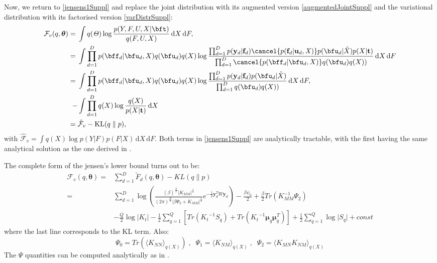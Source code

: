 %
Now, we return to \ref{jensens1Suppl} and replace the joint distribution with its augmented version \eqref{augmentedJointSuppl} and the variational distribution with its factorised version \eqref{varDistrSuppl}:
\begin{align}
\mathcal{F}_v(q, \boldsymbol \theta) = {}& \int q(\mathit{\Theta}) \log 
		\frac{ p(Y,F, U,X | \bft)}
			 {q(F, U,X)}  \, \mathrm{d} X \,\mathrm{d}F,
 	    \nonumber \\
= {}& \int \prod_{d=1}^D p(\bff_d | \bfu_d, X )q(\bfu_d) q(X) 
	    \log  \frac{\prod_{d=1}^D p(\mathbf{y}_d | \mathbf{f}_d) \cancel{p(\mathbf{f}_d | \mathbf{u}_d, \mathit{X})}
						p(\bfu_d | \tilde{X})  p(X | \mathbf{t})}
 	      		   {\prod_{d=1}^D \cancel{p(\bff_d | \bfu_d, X )}q(\bfu_d) q(X))}   \, \mathrm{d} X \,\mathrm{d}F \nonumber \\
= {}& \int \prod_{d=1}^D p(\bff_d | \bfu_d, X )q(\bfu_d) q(X) 
		\log  \frac{\prod_{d=1}^D p(\mathbf{y}_d | \mathbf{f}_d) p(\bfu_d | \tilde{X})}
				   {\prod_{d=1}^D q(\bfu_d) q(X))}   \, \mathrm{d} X \,\mathrm{d}F, \nonumber \\
- {}& \int \prod_{d=1}^D  q(X)   \log \frac{q(X)}{p(X | \mathbf{t})}   \, \mathrm{d} X \nonumber \\
= {}& \hat{\mathcal{F}}_v - \text{KL}(q \parallel p), \label{jensens1Suppl}
\end{align}
%
with $\hat{\mathcal{F}}_v =\int q(X) \log p( Y | F ) p( F | X) \,
\mathrm{d} X \,\mathrm{d}F$. Both terms in \eqref{jensens1Suppl} are analytically tractable, with the first having the same analytical solution as the one derived in \cite{BayesianGPLVM}.

\par
The complete form of the jensen's lower bound turns out to be:
\begin{align}
\mathcal{F}_v(q, \boldsymbol \theta) = {}& \sum_{d=1}^{D} 
	\mathit{\tilde{F}}_d(q, \boldsymbol \theta) -  KL(q \parallel p) \nonumber \\
	= {}& 
	\sum_{d=1}^{D} 
		\log \left( 
		\frac{(\beta)^{\frac{N}{2}} \vert \mathit{K_{MM}} \vert ^\frac{1}{2} }
			 {(2\pi)^{\frac{N}{2}} \vert \beta \Psi_2 + \mathit{K_{MM}}  \vert ^\frac{1}{2} } 	
		 e^{-\frac{1}{2} \mathbf{y}^{T}_{d} W \mathbf{y}_d} 
		 \right) -
		 \frac{\beta \psi_0}{2} + \frac{\beta}{2} 
		 Tr \left( \mathit{K_{MM}^{-1}} \Psi_2 \right)  \nonumber \\
{}&	- \frac{Q}{2} \log \vert \mathit{K_t} \vert - \frac{1}{2} \sum_{q=1}^{Q}
	  \left[ Tr \left( \mathit{K_t}^{-1} \mathit{S_q} \right)	  
	  	   + Tr \left( \mathit{K_t}^{-1} \boldsymbol \mu_q \boldsymbol \mu_q^T \right) \right] 
	 + \frac{1}{2} \sum_{q=1}^Q \log \vert \mathit{S_q} \vert + const  \label{boundFinal}
\end{align}
where the last line corresponds to the KL term. Also:
\begin{equation}
\label{psis}
\Psi_0 = Tr(\langle \mathit{K_{NN}} \rangle_{q(\mathit{X})}) \;, \;\;
\Psi_1 = \langle \mathit{K_{NM}} \rangle_{q(\mathit{X})} \;, \;\;
\Psi_2 = \langle \mathit{K_{MN}} \mathit{K_{NM}} \rangle_{q(\mathit{X})}
\end{equation}
The $\Psi$ quantities can be computed analytically as in \cite{BayesianGPLVM}.


